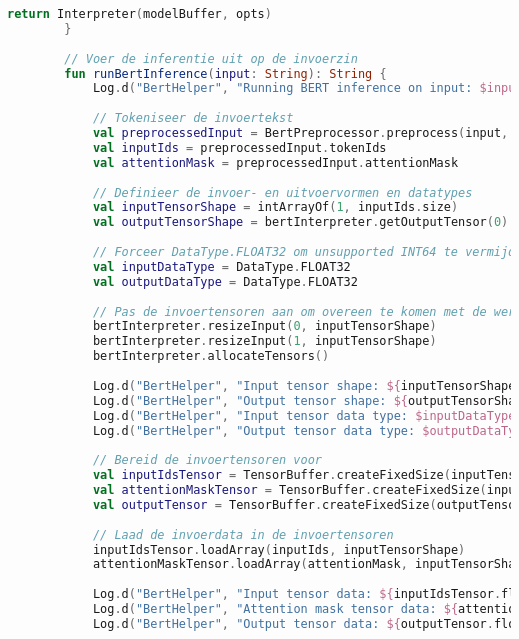 \begin{lstlisting}[language=Kotlin, caption={Implementatie van BertHelper}]
            return Interpreter(modelBuffer, opts)
        }
        
        // Voer de inferentie uit op de invoerzin
        fun runBertInference(input: String): String {
            Log.d("BertHelper", "Running BERT inference on input: $input")
            
            // Tokeniseer de invoertekst
            val preprocessedInput = BertPreprocessor.preprocess(input, vocab)
            val inputIds = preprocessedInput.tokenIds
            val attentionMask = preprocessedInput.attentionMask
            
            // Definieer de invoer- en uitvoervormen en datatypes
            val inputTensorShape = intArrayOf(1, inputIds.size)
            val outputTensorShape = bertInterpreter.getOutputTensor(0).shape()
            
            // Forceer DataType.FLOAT32 om unsupported INT64 te vermijden
            val inputDataType = DataType.FLOAT32
            val outputDataType = DataType.FLOAT32
            
            // Pas de invoertensoren aan om overeen te komen met de werkelijke vormen
            bertInterpreter.resizeInput(0, inputTensorShape)
            bertInterpreter.resizeInput(1, inputTensorShape)
            bertInterpreter.allocateTensors()
            
            Log.d("BertHelper", "Input tensor shape: ${inputTensorShape.contentToString()}")
            Log.d("BertHelper", "Output tensor shape: ${outputTensorShape.contentToString()}")
            Log.d("BertHelper", "Input tensor data type: $inputDataType")
            Log.d("BertHelper", "Output tensor data type: $outputDataType")
            
            // Bereid de invoertensoren voor
            val inputIdsTensor = TensorBuffer.createFixedSize(inputTensorShape, inputDataType)
            val attentionMaskTensor = TensorBuffer.createFixedSize(inputTensorShape, inputDataType)
            val outputTensor = TensorBuffer.createFixedSize(outputTensorShape, outputDataType)
            
            // Laad de invoerdata in de invoertensoren
            inputIdsTensor.loadArray(inputIds, inputTensorShape)
            attentionMaskTensor.loadArray(attentionMask, inputTensorShape)
            
            Log.d("BertHelper", "Input tensor data: ${inputIdsTensor.floatArray.contentToString()}")
            Log.d("BertHelper", "Attention mask tensor data: ${attentionMaskTensor.floatArray.contentToString()}")
            Log.d("BertHelper", "Output tensor data: ${outputTensor.floatArray.contentToString()}")
            

\end{lstlisting}
